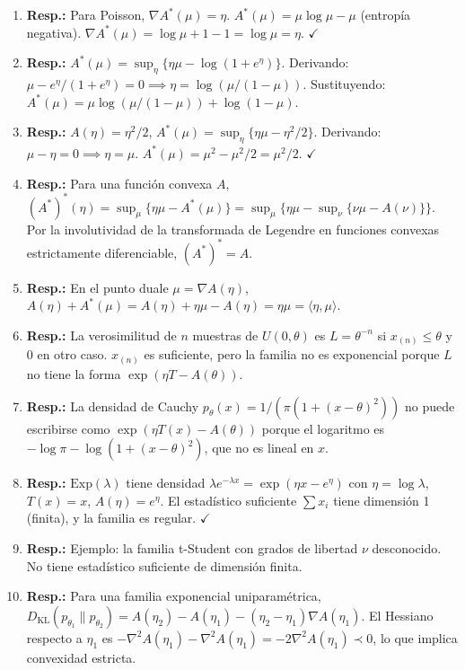\begin{enumerate}
	\item \textbf{Resp.:} Para Poisson, $\nabla A^*(\mu) = \eta$.  $A^*(\mu) = \mu\log\mu - \mu$ (entropía negativa).  $\nabla A^*(\mu) = \log\mu + 1 - 1 = \log\mu = \eta$.  $\checkmark$
	\item \textbf{Resp.:} $A^*(\mu) = \sup_\eta\{\eta\mu - \log(1+e^\eta)\}$.  Derivando: $\mu - e^\eta/(1+e^\eta) = 0 \implies \eta = \log(\mu/(1-\mu))$.  Sustituyendo: $A^*(\mu) = \mu\log(\mu/(1-\mu)) + \log(1-\mu)$.
	\item \textbf{Resp.:} $A(\eta) = \eta^2/2$, $A^*(\mu) = \sup_\eta\{\eta\mu - \eta^2/2\}$.  Derivando: $\mu - \eta = 0 \implies \eta = \mu$.  $A^*(\mu) = \mu^2 - \mu^2/2 = \mu^2/2$.  $\checkmark$
	\item \textbf{Resp.:} Para una función convexa $A$, $(A^*)^*(\eta) = \sup_\mu\{\eta\mu - A^*(\mu)\} = \sup_\mu\{\eta\mu - \sup_\nu\{\nu\mu - A(\nu)\}\}$.  Por la involutividad de la transformada de Legendre en funciones convexas estrictamente diferenciable, $(A^*)^* = A$.
	\item \textbf{Resp.:} En el punto duale $\mu = \nabla A(\eta)$, $A(\eta) + A^*(\mu) = A(\eta) + \eta\mu - A(\eta) = \eta\mu = \langle \eta, \mu \rangle$.
	\item \textbf{Resp.:} La verosimilitud de $n$ muestras de $U(0, \theta)$ es $L = \theta^{-n}$ si $x_{(n)} \le \theta$ y 0 en otro caso.  $x_{(n)}$ es suficiente, pero la familia no es exponencial porque $L$ no tiene la forma $\exp(\eta T - A(\theta))$.
	\item \textbf{Resp.:} La densidad de Cauchy $p_\theta(x) = 1/(\pi(1+(x-\theta)^2))$ no puede escribirse como $\exp(\eta T(x) - A(\theta))$ porque el logaritmo es $-\log\pi - \log(1+(x-\theta)^2)$, que no es lineal en $x$.
	\item \textbf{Resp.:} $\mathrm{Exp}(\lambda)$ tiene densidad $\lambda e^{-\lambda x} = \exp(\eta x - e^\eta)$ con $\eta = \log\lambda$, $T(x) = x$, $A(\eta) = e^\eta$.  El estadístico suficiente $\sum x_i$ tiene dimensión 1 (finita), y la familia es regular.  $\checkmark$
	\item \textbf{Resp.:} Ejemplo: la familia t-Student con grados de libertad $\nu$ desconocido.  No tiene estadístico suficiente de dimensión finita.
	\item \textbf{Resp.:} Para una familia exponencial uniparamétrica, $D_{\mathrm{KL}}(p_{\theta_1} \| p_{\theta_2}) = A(\eta_2) - A(\eta_1) - (\eta_2 - \eta_1)\nabla A(\eta_1)$.  El Hessiano respecto a $\eta_1$ es $-\nabla^2 A(\eta_1) - \nabla^2 A(\eta_1) = -2\nabla^2 A(\eta_1) \prec 0$, lo que implica convexidad estricta.
\end{enumerate}

